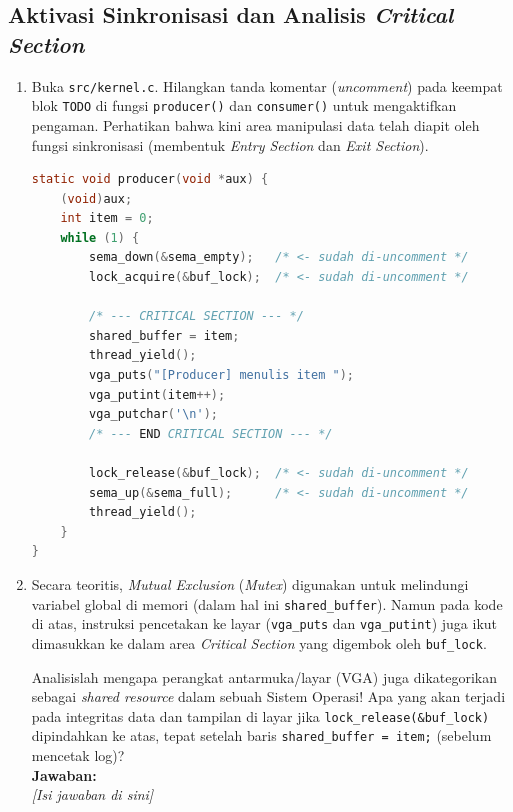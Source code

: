 \subsection{Aktivasi Sinkronisasi dan Analisis \textit{Critical Section}}

\begin{enumerate}

	\item Buka \texttt{src/kernel.c}. Hilangkan tanda komentar (\textit{uncomment}) pada keempat blok \texttt{TODO} di fungsi \texttt{producer()} dan \texttt{consumer()} untuk mengaktifkan pengaman.
	      Perhatikan bahwa kini area manipulasi data telah diapit oleh fungsi sinkronisasi (membentuk \textit{Entry Section} dan \textit{Exit Section}).

	      \begin{lstlisting}[language=C, caption={Tampilan \texttt{producer()} setelah hilangkan blok komentar}]
static void producer(void *aux) {
    (void)aux;
    int item = 0;
    while (1) {
        sema_down(&sema_empty);   /* <- sudah di-uncomment */
        lock_acquire(&buf_lock);  /* <- sudah di-uncomment */

        /* --- CRITICAL SECTION --- */
        shared_buffer = item;
        thread_yield();
        vga_puts("[Producer] menulis item ");
        vga_putint(item++);
        vga_putchar('\n');
        /* --- END CRITICAL SECTION --- */

        lock_release(&buf_lock);  /* <- sudah di-uncomment */
        sema_up(&sema_full);      /* <- sudah di-uncomment */
        thread_yield();
    }
}
    \end{lstlisting}

	\item Secara teoritis, \textit{Mutual Exclusion} (\textit{Mutex}) digunakan untuk melindungi variabel global di memori (dalam hal ini \texttt{shared\_buffer}). Namun pada kode di atas,
	      instruksi pencetakan ke layar (\texttt{vga\_puts} dan \texttt{vga\_putint}) juga ikut dimasukkan ke dalam area \textit{Critical Section} yang digembok oleh \texttt{buf\_lock}.

	      Analisislah mengapa perangkat antarmuka/layar (VGA) juga dikategorikan sebagai \textit{shared resource} dalam sebuah Sistem Operasi! Apa yang akan terjadi pada integritas data dan
	      tampilan di layar jika \texttt{lock\_release(\&buf\_lock)} dipindahkan ke atas, tepat setelah baris \texttt{shared\_buffer = item;} (sebelum mencetak log)?\\[0.2cm]
	      \textbf{Jawaban:}\\
	      \textit{[Isi jawaban di sini]}

\end{enumerate}

